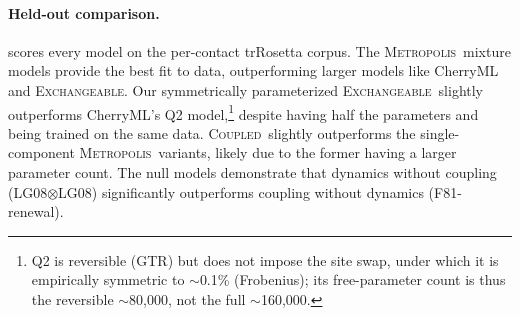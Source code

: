 \documentclass{article}
\newcommand{\Coupledm}{\textsc{Coupled}}
\newcommand{\Exchm}{\textsc{Exchangeable}}
\newcommand{\Metrop}{\textsc{Metropolis}}
\newcommand{\Pfam}{\textsc{Pfam}}
\begin{document}


\paragraph{Held-out comparison.}  scores every model on the 
per-contact trRosetta corpus.
The \Metrop\ mixture models provide the best fit to data, outperforming larger models like CherryML and \Exchm.
Our symmetrically parameterized \Exchm\ slightly outperforms CherryML's Q2 
model,\footnote{Q2 is reversible (GTR) but does not impose the site swap, under which it is 
empirically symmetric to $\sim$0.1\% (Frobenius); its free-parameter count is thus the reversible 
$\sim$80{,}000, not the full $\sim$160{,}000.} despite having half the parameters and being 
trained on the same data.
\Coupledm\ slightly outperforms the single-component \Metrop\ variants, likely due to the former
having a larger parameter count.
The null models demonstrate that dynamics without coupling (LG08$\otimes$LG08) significantly outperforms coupling without dynamics (F81-renewal).
\end{document}
